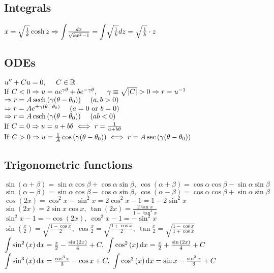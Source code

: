 \subsection{Integrals}
\begin{compactitem}
\item $x=\sqrt\frac{1}{k}\cosh{z}\then \scaleint{5ex}\frac{dx}{\sqrt{kx^{2}-1}}=\scaleint{5ex}\sqrt{\frac{1}{k}}dz=\sqrt{\frac{1}{k}}\cdot z$
\end{compactitem}




\subsection{ODEs}
\begin{compactitem}
	\item $u''+Cu=0,\ \ \ \ C\in\mathbb{R}$\\
	If $C<0\Rightarrow u=a e^{\gamma\theta}+b e^{-\gamma\theta},\ \ \ \ \gamma\equiv\sqrt{|C|}>0\Rightarrow r=u^{-1}$\\
	$\then r=A\sech{(\gamma(\theta-\theta_{0}))}\ \ \ \ (a,b>0)$\\
	$\then r=Ae^{\pm\gamma(\theta-\theta_{0})}\ \ \ \ (a=0 \text{ or }b=0)$\\
	$\then r=A\csch{(\gamma(\theta-\theta_{0}))}\ \ \ \ (ab<0)$\\
	If $C=0\Rightarrow u=a+b\theta\iff r=\frac{1}{a+b\theta}$\\
	If $C>0\Rightarrow u=\frac{1}{A}\cos{(\gamma(\theta-\theta_{0}))}\iff r=A\sec{(\gamma(\theta-\theta_{0}))}$
\end{compactitem}





\subsection{Trigonometric functions}
$\sin{(\alpha +\beta)}=\sin\alpha\cos\beta+\cos{\alpha}\sin\beta,\ \cos{(\alpha+\beta)}=\cos\alpha\cos\beta-\sin\alpha\sin\beta$\\
$\sin(\alpha-\beta)=\sin\alpha\cos\beta-\cos{\alpha}\sin\beta,\ \cos{(\alpha-\beta)}=\cos\alpha\cos\beta+\sin\alpha\sin\beta$\\
$\cos(2x)=\cos^2x-\sin^2x=2\cos^2x-1=1-2\sin^2x$\\
$\sin(2x)=2\sin x\cos x,\ \tan(2x)=\frac{2\tan x}{1-\tan^2x}$\\
$\sin^2x-1=-\cos(2x),\ \cos^2x-1=-\sin^2x$\\
$\sin(\frac{x}{2})=\sqrt{\frac{1-\cos x}{2}},\ \cos{\frac{x}{2}}=\sqrt{\frac{1+\cos x}{2}},\ \tan{\frac{x}{2}}=\sqrt{\frac{1-\cos x}{1+\cos{x}}}$\\
$\scaleint{5ex}\sin^{2}{(x)}\dd{x}=\frac{x}{2}-\frac{\sin{(2x)}}{4}+C,\ \scaleint{5ex}\cos^{2}{(x)}\dd{x}=\frac{x}{2}+\frac{\sin{(2x)}}{4}+C$\\
$\scaleint{5ex}\sin^{3}{(x)}\dd{x}=\frac{\cos^{3}{x}}{3}-\cos{x}+C,\ \scaleint{5ex}\cos^{3}{(x)}\dd{x}=\sin{x}-\frac{\sin^{3}{x}}{3}+C$



